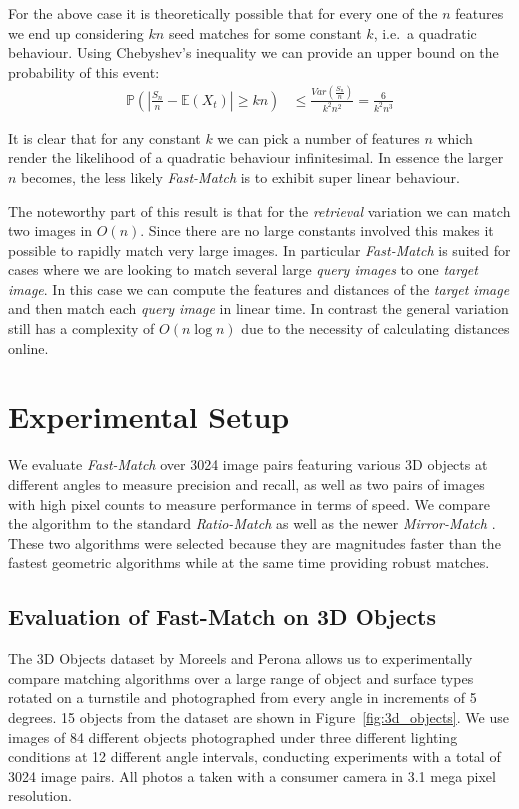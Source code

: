 \documentclass[runningheads]{llncs}
\begin{document}
For the above case it is theoretically possible that for every one of the $n$ features we end up considering $kn$ seed matches for some constant $k$, i.e.\ a quadratic behaviour. Using Chebyshev's inequality we can provide an upper bound on the probability of this event:
\begin{align}
    \label{bound}
    \mathbb{P}\left(\left| \frac{S_n}{n} - \mathbb{E}(X_t) \right| \ge kn\right) &\le \frac{Var\left(\frac{S_n}{n}\right)}{k^2n^2} = \frac{6}{k^2n^3}
\end{align}

It is clear that for any constant $k$ we can pick a number of features $n$ which render the likelihood of a quadratic behaviour infinitesimal. In essence the larger $n$ becomes, the less likely \emph{Fast-Match} is to exhibit super linear behaviour.

The noteworthy part of this result is that for the \emph{retrieval} variation we can match two images in $O(n)$. Since there are no large constants involved this makes it possible to rapidly match very large images. In particular \emph{Fast-Match} is suited for cases where we are looking to match several large \emph{query images} to one \emph{target image}. In this case we can compute the features and distances of the \emph{target image} and then match each \emph{query image} in linear time. In contrast the general variation still has a complexity of $O(n \log n)$ due to the necessity of calculating distances online.

\section{Experimental Setup}
\label{experiments}
%
We evaluate \emph{Fast-Match} over 3024 image pairs featuring various 3D objects at different angles to measure precision and recall, as well as two pairs of images with high pixel counts to measure performance in terms of speed. We compare the algorithm to the standard \emph{Ratio-Match} \cite{lowe2004sift} as well as the newer \emph{Mirror-Match} \cite{arnfred2013mirror}. These two algorithms were selected because they are magnitudes faster than the fastest geometric algorithms while at the same time providing robust matches.

\subsection{Evaluation of Fast-Match on 3D Objects}
\label{3dobjects}
%
The 3D Objects dataset by Moreels and Perona \cite{moreels2007evaluation} allows us to experimentally compare matching algorithms over a large range of object and surface types rotated on a turnstile and photographed from every angle in increments of 5 degrees. 15 objects from the dataset are shown in Figure~\ref{fig:3d_objects}.  We use images of 84 different objects photographed under three different lighting conditions at 12 different angle intervals, conducting experiments with a total of 3024 image pairs. All photos a taken with a consumer camera in 3.1 mega pixel resolution.
\end{document}
